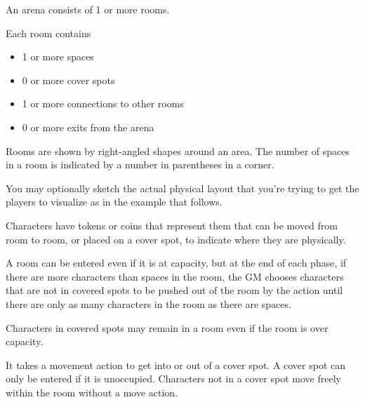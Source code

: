 An arena consists of 1 or more rooms.

Each room contains
\begin{itemize}
	\item 1 or more spaces
	\item 0 or more cover spots
	\item 1 or more connections to other rooms
	\item 0 or more exits from the arena
\end{itemize}

\begin{GRPfig}
	\caption{Room Diagram Example}
	
\end{GRPfig}

Rooms are shown by right-angled shapes around an area. The number of spaces in a room is indicated by a number in parentheses in a corner.

\begin{GRPfig}
	\caption{Symbols for Cover Spots}
	\begin{center}
	
	\end{center}
\end{GRPfig}

You may optionally sketch the actual physical layout that you're trying to get the players to visualize as in the example that follows.

\begin{GRPfigwide}
\caption{An example schematic diagram of an arena}

\end{GRPfigwide}

Characters have tokens or coins that represent them that can be moved from room to room, or placed on a cover spot, to indicate where they are physically.

A room can be entered even if it is at capacity, but at the end of each phase, if there are more characters than spaces in the room, the GM chooses characters that are not in covered spots to be pushed out of the room by the action until there are only as many characters in the room as there are spaces.

Characters in covered spots may remain in a room even if the room is over capacity.

It takes a movement action to get into or out of a cover spot. A cover spot can only be entered if it is unoccupied.
Characters not in a cover spot move freely within the room without a move action.

